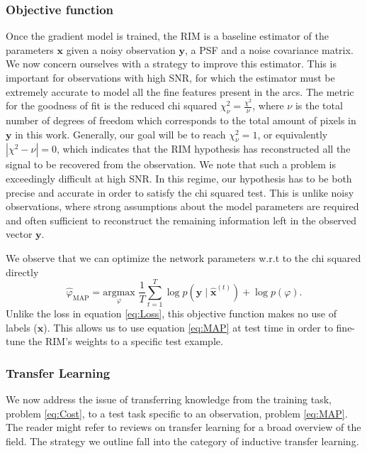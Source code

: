 \subsubsection{Objective function}
Once the gradient model is trained, the RIM is a baseline 
estimator of the parameters $\mathbf{x}$ given a noisy observation $\mathbf{y}$, 
a PSF and a noise covariance matrix. 
We now concern ourselves with a strategy to improve 
this estimator. 
This is important 
for observations with high SNR, for which the estimator
must be extremely accurate to model all the fine features present in the arcs.
The metric for the goodness of fit 
is the reduced chi squared $\chi^2_\nu = \frac{\chi^2}{\nu}$, 
where $\nu$ is the total number of degrees of freedom which corresponds to 
the total amount of pixels in $\mathbf{y}$ in this work.
Generally, our goal will be to reach $\chi^2_\nu = 1$, or equivalently $|\chi^2 - \nu| = 0$, 
which indicates that the RIM hypothesis has reconstructed all the signal 
to be recovered from the observation. 
We note that such a problem is exceedingly  
difficult at high SNR. In this regime, 
our hypothesis has 
to be both precise and accurate in order to satisfy the chi squared test. 
This is unlike noisy observations, where strong assumptions about the model 
parameters are required and often sufficient to reconstruct the 
remaining information left in the observed vector $\mathbf{y}$.

We observe that we can optimize the network parameters w.r.t to the 
chi squared directly
\begin{equation}\label{eq:MAP} 
        \hat{\varphi}_{\mathrm{MAP}} = \underset{\varphi}{\mathrm{argmax}}\,\, 
        \frac{1}{T}\sum_{t=1}^{T} \log p(\mathbf{y} \mid \mathbf{\hat{x}}^{(t)}) + \log p(\varphi).
\end{equation} 
Unlike the loss in equation \eqref{eq:Loss}, this objective function makes no use of labels 
($\mathbf{x}$). 
This allows us to use equation \eqref{eq:MAP} at test time in order to fine-tune the RIM's weights to a specific test example. 

\subsubsection{Transfer Learning}
We now address the issue of transferring knowledge from the training task, problem \eqref{eq:Cost}, 
to a test task specific to an observation, problem \eqref{eq:MAP}.
The reader might refer to reviews on transfer learning \citep{Pan2010,Zhuang2019} 
for a broad overview of the field. The strategy we outline fall into 
the category of inductive transfer learning.

